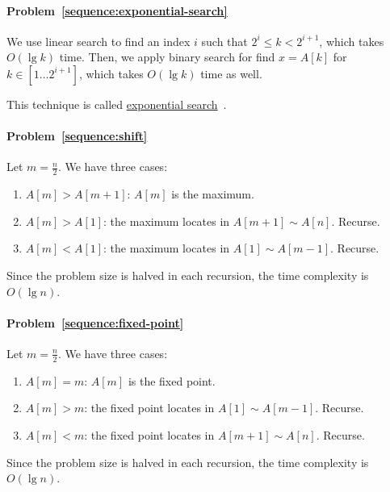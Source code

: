 \begin{Answer}
\paragraph{Problem~\ref{sequence:exponential-search}}
We use linear search to find an index $i$ such that $2^i \leq k < 2^{i+1}$, which takes $O(\lg k)$ time.
Then, we apply binary search for find $x = A[k]$ for $k \in [1 \dots 2^{i + 1}]$, which takes $O(\lg k)$ time as well.

\begin{remark}
This technique is called \href{https://en.wikipedia.org/wiki/Exponential_search}{exponential search}~\cite{Bentley1976}.
\end{remark}

\paragraph{Problem~\ref{sequence:shift}}
Let $m = \frac{n}{2}$. We have three cases:
\begin{enumerate}
\item $A[m] > A[m+1]$: $A[m]$ is the maximum.
\item $A[m] > A[1]$: the maximum locates in $A[m + 1] \sim A[n]$. Recurse.
\item $A[m] < A[1]$: the maximum locates in $A[1] \sim A[m-1]$. Recurse.
\end{enumerate}
Since the problem size is halved in each recursion, the time complexity is $O(\lg n)$.

\paragraph{Problem~\ref{sequence:fixed-point}}
Let $m = \frac{n}{2}$. We have three cases:
\begin{enumerate}
\item $A[m] = m$: $A[m]$ is the fixed point.
\item $A[m] > m$: the fixed point locates in $A[1] \sim A[m - 1]$. Recurse.
\item $A[m] < m$: the fixed point locates in $A[m + 1] \sim A[n]$. Recurse.
\end{enumerate}
Since the problem size is halved in each recursion, the time complexity is $O(\lg n)$.

\end{Answer}

